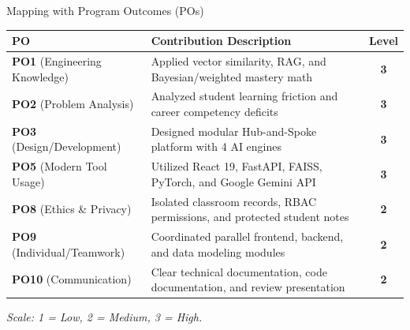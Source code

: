 \documentclass[aspectratio=169,10pt]{beamer}
\begin{document}
\begin{frame}{Mapping with Program Outcomes (POs)}
  \begin{table}[]
    \centering
    \small
    \begin{tabular}{llc}
      \toprule
      \textbf{PO} & \textbf{Contribution Description} & \textbf{Level} \\
      \midrule
      \textbf{PO1} (Engineering Knowledge) & Applied vector similarity, RAG, and Bayesian/weighted mastery math & \textbf{3} \\
      \textbf{PO2} (Problem Analysis) & Analyzed student learning friction and career competency deficits & \textbf{3} \\
      \textbf{PO3} (Design/Development) & Designed modular Hub-and-Spoke platform with 4 AI engines & \textbf{3} \\
      \textbf{PO5} (Modern Tool Usage) & Utilized React 19, FastAPI, FAISS, PyTorch, and Google Gemini API & \textbf{3} \\
      \textbf{PO8} (Ethics \& Privacy) & Isolated classroom records, RBAC permissions, and protected student notes & \textbf{2} \\
      \textbf{PO9} (Individual/Teamwork) & Coordinated parallel frontend, backend, and data modeling modules & \textbf{2} \\
      \textbf{PO10} (Communication) & Clear technical documentation, code documentation, and review presentation & \textbf{2} \\
      \bottomrule
    \end{tabular}
  \end{table}
  \footnotesize \textit{Scale: 1 = Low, 2 = Medium, 3 = High.}
\end{frame}
\end{document}
